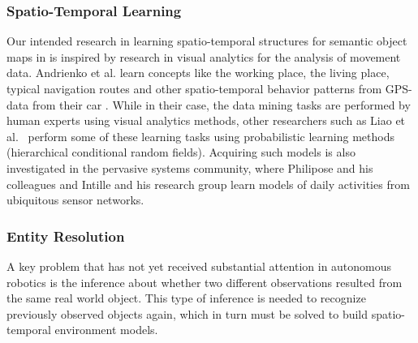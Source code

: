 \subsubsection{Spatio-Temporal Learning}
\label{sec:spatio-temporal-learning}

Our intended research in learning spatio-temporal structures for
semantic object maps in \ksem is inspired by research in visual analytics for the analysis
of movement data. Andrienko et al. learn concepts like the
working place, the living place, typical navigation routes and other
spatio-temporal behavior patterns from GPS-data from their car
\cite{Andrienko07}. While in their case, the data mining tasks are
performed by human experts using visual analytics methods, other
researchers such as Liao et al.\ \cite{Liao07a,Liao07b} perform some
of these learning tasks using probabilistic learning
methods (hierarchical conditional random fields).
Acquiring such models is also investigated in the pervasive
systems community, where Philipose and his colleagues
\cite{Pentney07,Landwehr07} and Intille and his research group
\cite{Intille06} learn models of daily activities from ubiquitous
sensor networks.



\subsubsection{Entity Resolution}
\label{sec:entity-resolution}

A key problem that has not yet received substantial attention in
autonomous robotics is the inference about whether two different
observations resulted from the same real world object. This type
of inference is needed to recognize previously observed objects again,
which in turn must be solved to build spatio-temporal environment models.


